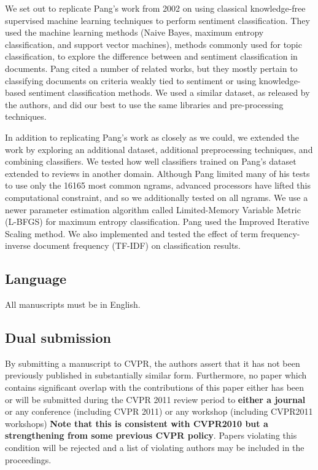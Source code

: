 \documentclass[10pt,twocolumn,letterpaper]{article}
\begin{document}
We set out to replicate Pang’s work from 2002 on using classical knowledge-free supervised machine learning techniques to perform sentiment classification. They used the machine learning methods (Naive Bayes, maximum entropy classification, and support vector machines), methods commonly used for topic classification, to explore the difference between and sentiment classification in documents. Pang cited a number of related works, but they mostly pertain to classifying documents on criteria weakly tied to sentiment or using knowledge-based sentiment classification methods. We used a similar dataset, as released by the authors, and did our best to use the same libraries and pre-processing techniques.

In addition to replicating Pang’s work as closely as we could, we extended the work by exploring an additional dataset, additional preprocessing techniques, and combining classifiers. We tested how well classifiers trained on Pang’s dataset extended to reviews in another domain. Although Pang limited many of his tests to use only the 16165 most common ngrams, advanced processors have lifted this computational constraint, and so we additionally tested on all ngrams. We use a newer parameter estimation algorithm called Limited-Memory Variable Metric (L-BFGS) for maximum entropy classification. Pang used the Improved Iterative Scaling method. We also implemented and tested the effect of term frequency-inverse document frequency (TF-IDF) on classification results.

\subsection{Language}

All manuscripts must be in English.

\subsection{Dual submission}

By submitting a manuscript to CVPR, the authors assert that it has not been
previously published in substantially similar form. Furthermore, no paper
which contains significant overlap with the contributions of this paper
either has been or will be submitted during the CVPR 2011 review period to
{\bf either a journal} or any conference (including CVPR 2011) or any
workshop (including CVPR2011 workshops)
 {\bf Note that
  this is consistent with CVPR2010 but a strengthening from some previous CVPR
  policy}.  Papers violating this condition will be rejected and a list of violating authors may be included in the proceedings. 
\end{document}

